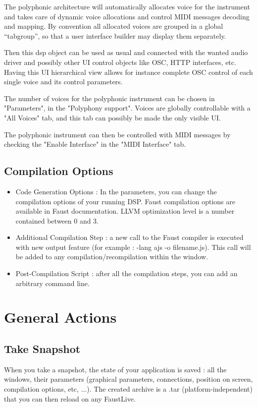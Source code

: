 \documentclass[a4paper]{article}
\begin{document}
The polyphonic architecture will automatically allocates voice for the instrument and takes care of dynamic voice allocations and control MIDI messages decoding and mapping.  By convention all allocated voices are grouped in a global “tabgroup”, so that a user interface builder may display them separately. 

Then this dsp object can be used as usual and connected with the wanted audio driver and possibly other UI control objects like OSC, HTTP interfaces, etc. Having this UI hierarchical view allows for instance complete OSC control of each single voice and its control parameters. 

The number of voices for the polyphonic instrument can be chosen in "Parameters", in the "Polyphony support". Voices are globally controllable with a "All Voices" tab, and this tab can possibly be made the only visible UI. 

The polyphonic instrument can then be controlled with MIDI messages by checking the  "Enable Interface" in the "MIDI Interface" tab.

\subsection{Compilation Options}

\begin{itemize}

\item Code Generation Options : In the parameters, you can change the compilation options of your running DSP. Faust compilation options are available in Faust documentation. LLVM optimization level is a number contained between 0 and 3. 

\item Additional Compilation Step : a new call to the Faust compiler is executed with new output feature (for example : -lang ajs -o filename.js). This call will be added to any compilation/recompilation within the window.

\item Post-Compilation Script : after all the compilation steps, you can add an arbitrary command line.

\end{itemize}

\section{General Actions}

\subsection{Take Snapshot}
 When you take a snapshot, the state of your application is saved : all the windows, their parameters (graphical parameters, connections, position on screen, compilation options, etc, ...). The created archive is a .tar (platform-independent) that you can then reload on any FaustLive. 
\end{document}
